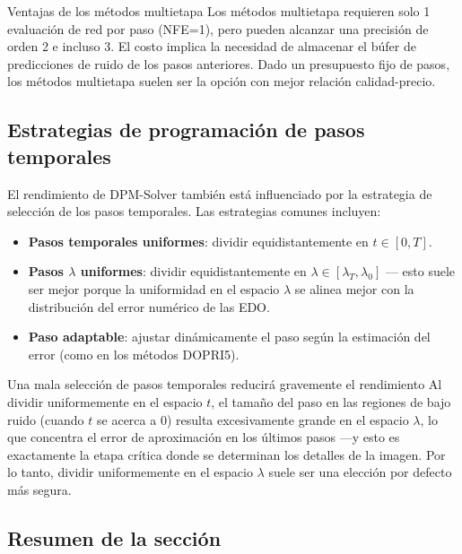 \documentclass[a4paper]{article}
\begin{document}
\begin{importantbox}{Ventajas de los métodos multietapa}
Los métodos multietapa requieren solo 1 evaluación de red por paso (NFE=1), pero pueden alcanzar una precisión de orden 2 e incluso 3. El costo implica la necesidad de almacenar el búfer de predicciones de ruido de los pasos anteriores. Dado un presupuesto fijo de pasos, los métodos multietapa suelen ser la opción con mejor relación calidad-precio.
\end{importantbox}

\subsection{Estrategias de programación de pasos temporales}

El rendimiento de DPM-Solver también está influenciado por la estrategia de selección de los pasos temporales. Las estrategias comunes incluyen:

\begin{itemize}
    \item \textbf{Pasos temporales uniformes}: dividir equidistantemente en $t \in [0, T]$.
    \item \textbf{Pasos $\lambda$ uniformes}: dividir equidistantemente en $\lambda \in [\lambda_T, \lambda_0]$ — esto suele ser mejor porque la uniformidad en el espacio $\lambda$ se alinea mejor con la distribución del error numérico de las EDO.
    \item \textbf{Paso adaptable}: ajustar dinámicamente el paso según la estimación del error (como en los métodos DOPRI5).
\end{itemize}

\begin{warningbox}{Una mala selección de pasos temporales reducirá gravemente el rendimiento}
Al dividir uniformemente en el espacio $t$, el tamaño del paso en las regiones de bajo ruido (cuando $t$ se acerca a 0) resulta excesivamente grande en el espacio $\lambda$, lo que concentra el error de aproximación en los últimos pasos —y esto es exactamente la etapa crítica donde se determinan los detalles de la imagen. Por lo tanto, dividir uniformemente en el espacio $\lambda$ suele ser una elección por defecto más segura.
\end{warningbox}

\subsection{Resumen de la sección}
\end{document}
